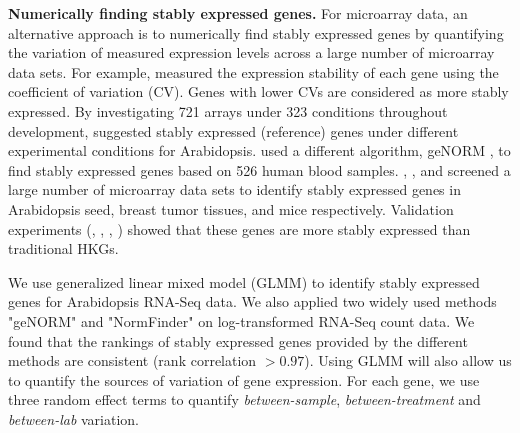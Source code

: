 \documentclass[11pt, a4paper]{article}
\begin{document}
\textbf{Numerically finding stably expressed genes.}
For microarray data, an alternative approach is to numerically find stably
expressed genes by quantifying the variation of measured expression levels
across a large number of microarray data sets. 
For example,  \cite{czechowski2005genome}
measured the expression stability of each gene using the coefficient of
variation (CV). Genes with lower CVs are considered as more stably expressed.
By investigating 721 arrays under 323 conditions throughout development,
\cite{czechowski2005genome} suggested stably expressed (reference) genes under
different experimental conditions for Arabidopsis.
\cite{stamova2009identification} used a different algorithm, geNORM
\citep{vandesompele2002accurate}, to find stably expressed genes based on 526
human blood samples. 
 \citet{dekkers2012identification}, \citet{gur2009identification}, and
 \citet{frericks2008toolbox} screened a large number of microarray data sets
 to identify stably expressed genes in Arabidopsis seed, breast tumor tissues,
 and mice respectively.
Validation experiments (\cite{czechowski2005genome},
\cite{dekkers2012identification}, \cite{huggett2005real},
\cite{stamova2009identification}) showed that these genes are more stably
expressed than traditional HKGs.  




We
use generalized linear mixed model (GLMM) \citep{mccullagh1989generalized} to
identify stably expressed genes for Arabidopsis RNA-Seq data. 
We also applied two widely used methods "geNORM"
\citep{vandesompele2002accurate} and  "NormFinder"
\citep{andersen2004normalization} on log-transformed RNA-Seq count data.
We found that the rankings of stably expressed genes provided by the different
methods are consistent (rank correlation $> 0.97$).  Using GLMM will also
allow us to quantify the sources of variation of gene expression. For each
gene, we use three random effect terms to quantify \textit{between-sample},
\textit{between-treatment} and \textit{between-lab} variation. 
\end{document}
